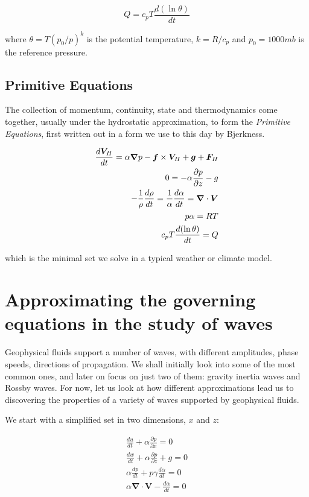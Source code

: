  \begin{equation}
 	Q= c_p T \frac{d(\ln \theta)}{dt}
 \end{equation}

where $\theta = T{(p_0/p)}^k$ is the potential temperature, $k=R/c_p$ and $p_0=1000mb$ is the reference pressure.


\subsection{Primitive Equations}
The collection of momentum, continuity, state and thermodynamics come together, usually under the hydrostatic approximation, to form the \emph{Primitive Equations}, first written out in a form we use to this day by Bjerkness.

\begin{eqnarray}
		\frac{d \bm{V}_H}{dt} = \alpha \mbox{\boldmath $\nabla$}{p} - \bm{f} \times \bm{V}_H + \bm{g} + \bm{F}_H  \\
	0 = -\alpha \frac{\partial p}{\partial z} - g \nonumber \\
	-\frac{1}{\rho} \frac{d \rho}{dt} =   \frac{1}{\alpha} \frac{d \alpha}{dt}     = \bm{\nabla} \cdot  \bm{V} \nonumber \\
	p\alpha=RT \nonumber \\
	c_p T \frac{d(\ln \theta)}{dt} = Q \nonumber
	\label{primitive}
\end{eqnarray}

which is the minimal set we solve in a typical weather or climate model.


\section{Approximating the governing equations in the study of waves}

Geophysical fluids support a number of waves, with different amplitudes, phase speeds, directions of propagation. We shall initially look into some of the most common ones, and later on focus on just two of them: gravity inertia waves and Rossby waves. For now, let us look at how different approximations lead us to discovering the properties of a variety of waves supported by geophysical fluids.

We start with a simplified set in two dimensions, $x$ and $z$:

\begin{eqnarray}
	\frac{d u}{dt} + \alpha \frac{\partial p}{\partial x} = 0\\
		\frac{d w}{dt} + \alpha \frac{\partial p}{\partial z} + g =0 \nonumber \\
	\alpha \frac{d p}{d t} +p \gamma \frac{d \alpha}{dt}  = 0 \nonumber \\
  \alpha \bm{\nabla} \cdot  \bm{V}  -  \frac{d \alpha}{dt}     = 0 \nonumber
  \label{primitive_1d}
\end{eqnarray}

